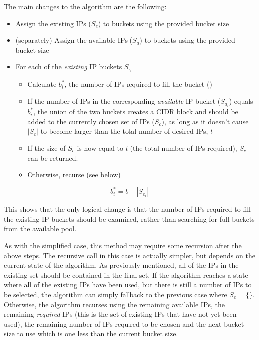 The main changes to the algorithm are the following:

\begin{itemize}
  \item{Assign the existing IPs ($S_e$) to buckets using the provided bucket size}
  \item{(separately) Assign the available IPs ($S_a$) to buckets using the provided bucket size}
  \item{For each of the \textit{existing} IP buckets $S_{e_i}$}
      \begin{itemize}
      \item{Calculate $b^*_i$, the number of IPs required to fill the bucket ()}
      \item{If the number of IPs in the corresponding \textit{available} IP bucket ($S_{a_i}$) equals $b^*_i$, the union of the two buckets creates a CIDR block and should be added to the currently chosen set of IPs ($S_c$), as long as it doesn't cause $|S_c|$ to become larger than the total number of desired IPs, $t$}
      \item{If the size of $S_c$ is now equal to $t$ (the total number of IPs required), $S_c$ can be returned.}
      \item{Otherwise, recurse (see below)}
      \end{itemize}
\end{itemize}


\begin{equation}\label{eq:ipsToFillBucket}
b^*_i= b-|S_{e_i}|
\end{equation}


This shows that the only logical change is that the number of IPs required to fill the existing IP buckets should be examined, rather than searching for full buckets from the available pool. 

As with the simplified case, this method may require some recursion after the above steps. The recursive call in this case is actually simpler, but depends on the current state of the algorithm. As previously mentioned, all of the IPs in the existing set should be contained in the final set. If the algorithm reaches a state where all of the existing IPs have been used, but there is still a number of IPs to be selected, the algorithm can simply fallback to the previous case where $S_e = \{\}$. Otherwise, the algorithm recurses using the remaining available IPs, the remaining \textit{required} IPs (this is the set of existing IPs that have not yet been used), the remaining number of IPs required to be chosen and the next bucket size to use which is one less than the current bucket size.

